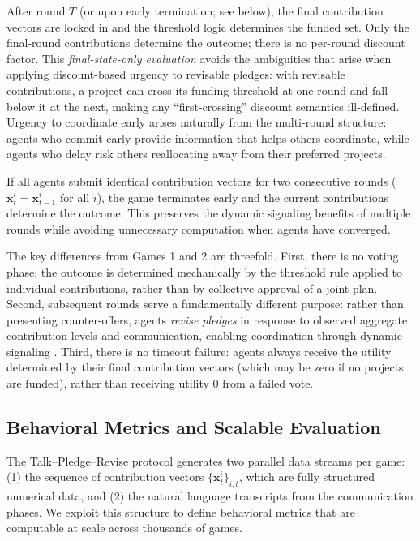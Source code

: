 After round $T$ (or upon early termination; see below), the final contribution vectors are locked in and the threshold logic determines the funded set.
Only the final-round contributions determine the outcome; there is no per-round discount factor.
This \emph{final-state-only evaluation} avoids the ambiguities that arise when applying discount-based urgency to revisable pledges: with revisable contributions, a project can cross its funding threshold at one round and fall below it at the next, making any ``first-crossing'' discount semantics ill-defined.
Urgency to coordinate early arises naturally from the multi-round structure: agents who commit early provide information that helps others coordinate, while agents who delay risk others reallocating away from their preferred projects.

If all agents submit identical contribution vectors for two consecutive rounds ($\bm{x}^i_t = \bm{x}^i_{t-1}$ for all $i$), the game terminates early and the current contributions determine the outcome.
This preserves the dynamic signaling benefits of multiple rounds while avoiding unnecessary computation when agents have converged.

The key differences from Games 1 and 2 are threefold.
First, there is no voting phase: the outcome is determined mechanically by the threshold rule applied to individual contributions, rather than by collective approval of a joint plan.
Second, subsequent rounds serve a fundamentally different purpose: rather than presenting counter-offers, agents \emph{revise pledges} in response to observed aggregate contribution levels and communication, enabling coordination through dynamic signaling \citep{marx2000dynamic}.
Third, there is no timeout failure: agents always receive the utility determined by their final contribution vectors (which may be zero if no projects are funded), rather than receiving utility 0 from a failed vote.

\subsection{Behavioral Metrics and Scalable Evaluation}
\label{sec:game_3_behavioral_metrics}

The Talk--Pledge--Revise protocol generates two parallel data streams per game: (1) the sequence of contribution vectors $\{\bm{x}^i_t\}_{i,t}$, which are fully structured numerical data, and (2) the natural language transcripts from the communication phases.
We exploit this structure to define behavioral metrics that are computable at scale across thousands of games.

